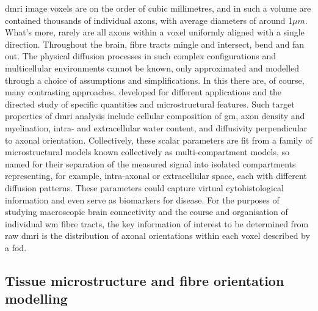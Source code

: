\gls{dmri} image \glspl{voxel} are on the order of cubic millimetres, and in such a volume are contained thousands of individual axons, with average diameters of around 1$\mu m$\autocite{Liewald2014,Lampinen2019}.
What's more, rarely are all axons within a voxel uniformly aligned with a single direction.
Throughout the brain, fibre tracts mingle and intersect, bend and fan out.\autocite{Jeurissen2013,Alexander2019}
The physical diffusion processes in such complex configurations and multicellular environments cannot be known, only approximated and modelled through a choice of assumptions and simplifications.
In this there are, of course, many contrasting approaches, developed for different applications and the directed study of specific quantities and microstructural features.
Such target properties of \gls{dmri} analysis include cellular composition of \gls{gm}, axon density and myelination, intra- and extracellular water content, and diffusivity perpendicular to axonal orientation.
Collectively, these scalar parameters are fit from a family of microstructural models known collectively as multi-compartment models, so named for their separation of the measured signal into isolated compartments representing, for example, intra-axonal or extracellular space, each with different diffusion patterns.\autocite{Panagiotaki2012,Alexander2019}
These parameters could capture virtual cytohistological information and even serve as biomarkers for disease\autocite{Alexander2008}.
For the purposes of studying macroscopic brain connectivity and the course and organisation of individual \gls{wm} fibre tracts, the key information of interest to be determined from raw \gls{dmri} is the distribution of axonal orientations within each voxel described by a \gls{fod}.

\subsection{Tissue microstructure  and fibre orientation modelling}


